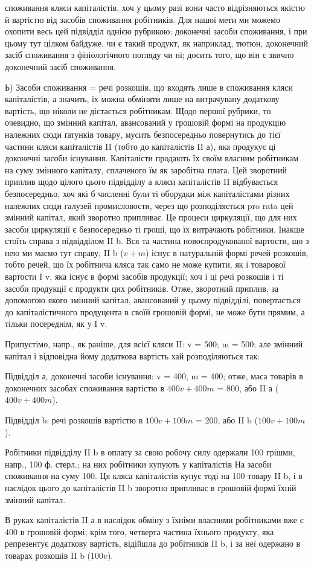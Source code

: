 \parcont{}  %
споживання кляси капіталістів, хоч у цьому разі вони часто відрізняються
якістю й вартістю від засобів споживання робітників. Для нашої мети
ми можемо охопити весь цей підвідділ однією рубрикою: доконечні
засоби споживання, і при цьому тут цілком байдуже, чи є такий продукт,
як наприклад, тютюн, доконечний засіб споживання з фізіологічного
погляду чи ні; досить того, що він є звично доконечний засіб споживання.

Ь) Засоби споживання = речі розкошів, що входять лише в
споживання кляси капіталістів, а значить, їх можна обміняти лише на
витрачувану додаткову вартість, що ніколи не дістається робітникам.
Щодо першої рубрики, то очевидно, що змінний капітал, авансований у
грошовій формі на продукцію належних сюди ґатунків товару, мусить
безпосередньо повернутись до тієї частини кляси капіталістів II (тобто
до капіталістів II а), яка продукує ці доконечні засоби існування. Капіталісти
продають їх своїм власним робітникам на суму змінного капіталу,
сплаченого їм як заробітна плата. Цей зворотний приплив щодо цілого
цього підвідділу а кляси капіталістів II відбувається безпосередньо,
хоч які б численні були ті оборудки між капіталістами різних належних
сюди галузей промисловости, через що розподіляється pro rata
цей змінний капітал, який зворотно припливає. Це процеси циркуляції,
що для них засоби циркуляції є безпосередньо ті гроші, що їх витрачають
робітники. Інакше стоїть справа з підвідділом II b. Вся та частина
новоспродукованої вартости, що з нею ми маємо тут справу, II b ($v + m$)
існує в натуральній формі речей розкошів, тобто речей, що їх робітнича
кляса так само не може купити, як і товарової вартости I v, яка існує
в формі засобів продукції; хоч і ці речі розкошів і ті засоби продукції
є продукти цих робітників. Отже, зворотний приплив, за допомогою
якого змінний капітал, авансований у цьому підвідділі, повертається до
капіталістичного продуцента в своїй грошовій формі, не може бути
прямим, а тільки посереднім, як у I v.

Припустімо, напр., як раніше, для всієї кляси II: v = 500; m = 500;
але змінний капітал і відповідна йому додаткова вартість хай розподіляються
так:

Підвідділ а, доконечні засоби існування: v = 400, m = 400; отже,
маса товарів в доконечних засобах споживання вартістю в $400 v + 400 m$
= 800, або II а ($400 v + 400 m$).

Підвідділ b: речі розкошів вартістю в $100 v + 100 m$ = 200, або
II b ($100 v + 100 m$).

Робітники підвідділу II b в оплату за свою робочу силу одержали
100 грішми, напр., 100 ф. стерл.; на них робітники купують у капіталістів
На засоби споживання на суму 100. Ця кляса капіталістів купує
тоді на 100 товару II b, і в наслідок цього до капіталістів II b зворотно
припливає в грошовій формі їхній змінний капітал.

В руках капіталістів II а в наслідок обміну з їхніми власними робітниками
вже є 400 в грошовій формі; крім того, четверта частина їхнього
продукту, яка репрезентує додаткову вартість, відійшла до робітників
II b, і за неї одержано в товарах розкошів II b ($100 v$).
